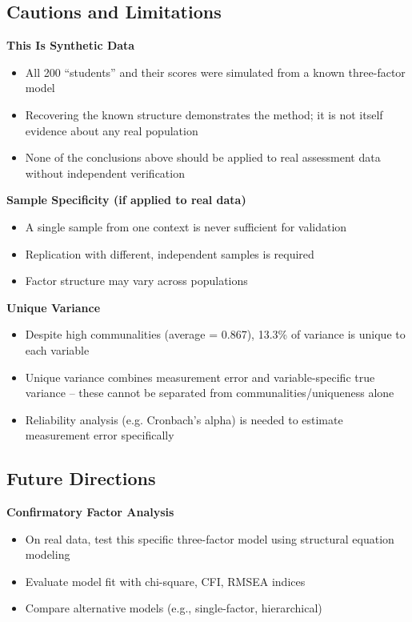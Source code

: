 \documentclass[
]{article}
\begin{document}
\subsection{Cautions and Limitations}

\textbf{This Is Synthetic Data}

\begin{itemize}
\item
  All 200 ``students'' and their scores were simulated from a known
  three-factor model
\item
  Recovering the known structure demonstrates the method; it is not
  itself evidence about any real population
\item
  None of the conclusions above should be applied to real assessment
  data without independent verification
\end{itemize}

\textbf{Sample Specificity (if applied to real data)}

\begin{itemize}
\item
  A single sample from one context is never sufficient for validation
\item
  Replication with different, independent samples is required
\item
  Factor structure may vary across populations
\end{itemize}

\textbf{Unique Variance}

\begin{itemize}
\item
  Despite high communalities (average = 0.867), 13.3\% of variance is
  unique to each variable
\item
  Unique variance combines measurement error and variable-specific true
  variance -- these cannot be separated from communalities/uniqueness
  alone
\item
  Reliability analysis (e.g. Cronbach's alpha) is needed to estimate
  measurement error specifically
\end{itemize}

\subsection{Future Directions}

\textbf{Confirmatory Factor Analysis}

\begin{itemize}
\item
  On real data, test this specific three-factor model using structural
  equation modeling
\item
  Evaluate model fit with chi-square, CFI, RMSEA indices
\item
  Compare alternative models (e.g., single-factor, hierarchical)
\end{itemize}
\end{document}
